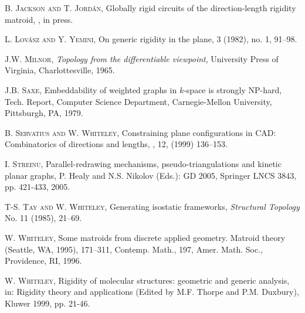 \documentclass[11pt]{article}
\begin{document}
\begin{thebibliography}{99}
 {\scshape B. Jackson and T. Jord\'an},
\newblock Globally rigid circuits of the direction-length
rigidity matroid,
, in press.


 {\scshape L. Lov\'asz and Y. Yemini},
\newblock On generic rigidity in the plane,
3 (1982), no. 1, 91--98.

 {\scshape J.W. Milnor},
\textit{Topology from the differentiable viewpoint},
University Press of Virginia, Charlottesville, 1965.

 {\scshape J.B. Saxe},
\newblock Embeddability of weighted graphs in
$k$-space is strongly NP-hard,
\newblock Tech. Report, Computer Science
Department, Carnegie-Mellon University, Pittsburgh, PA, 1979.

 {\scshape B. Servatius and W. Whiteley},
\newblock Constraining plane configurations in CAD:
Combinatorics of directions and lengths,
, 12, (1999) 136--153.

 {\scshape I. Streinu},
\newblock Parallel-redrawing mechanisms, pseudo-triangulations
and kinetic planar graphs,
\newblock P. Healy and N.S. Nikolov (Eds.): GD 2005,
Springer LNCS 3843, pp. 421-433, 2005.

 {\scshape T-S. Tay and W. Whiteley},
\newblock Generating isostatic frameworks,
\newblock
{\itshape Structural Topology} No. 11 (1985), 21--69.

 {\scshape
W. Whiteley},
\newblock Some matroids from discrete applied geometry.
\newblock Matroid theory (Seattle, WA, 1995), 171--311,
Contemp. Math., 197, Amer. Math. Soc., Providence, RI, 1996.

{\scshape W. Whiteley},
\newblock Rigidity of molecular structures: geometric and generic
analysis,
\newblock in: Rigidity theory and applications (Edited by M.F. Thorpe and
P.M. Duxbury),
Kluwer 1999, pp. 21-46.
\fi
\end{thebibliography}
\end{document}
